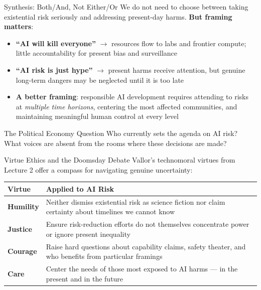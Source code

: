 \documentclass[aspectratio=169,11pt]{beamer}
\begin{document}
\begin{frame}{Synthesis: Both/And, Not Either/Or}
We do not need to choose between taking existential risk seriously and addressing present-day harms. \textbf{But framing matters}:

\vspace{0.2cm}
\begin{itemize}
    \item \textbf{``AI will kill everyone''} $\rightarrow$ resources flow to labs and frontier compute; little accountability for present bias and surveillance
    \item \textbf{``AI risk is just hype''} $\rightarrow$ present harms receive attention, but genuine long-term dangers may be neglected until it is too late
    \item \textbf{A better framing}: responsible AI development requires attending to risks at \emph{multiple time horizons}, centering the most affected communities, and maintaining meaningful human control at every level
\end{itemize}

\vspace{0.2cm}
\begin{alertblock}{The Political Economy Question}
Who currently sets the agenda on AI risk? What voices are absent from the rooms where these decisions are made?
\end{alertblock}
\end{frame}

\begin{frame}{Virtue Ethics and the Doomsday Debate}
Vallor's technomoral virtues from Lecture 2 offer a compass for navigating genuine uncertainty:

\vspace{0.2cm}
\begin{tabular}{@{}p{2.4cm}p{9.2cm}@{}}
\toprule
\textbf{Virtue} & \textbf{Applied to AI Risk} \\
\midrule
\textbf{Humility} & Neither dismiss existential risk as science fiction nor claim certainty about timelines we cannot know \\
\addlinespace
\textbf{Justice} & Ensure risk-reduction efforts do not themselves concentrate power or ignore present inequality \\
\addlinespace
\textbf{Courage} & Raise hard questions about capability claims, safety theater, and who benefits from particular framings \\
\addlinespace
\textbf{Care} & Center the needs of those most exposed to AI harms --- in the present and in the future \\
\bottomrule
\end{tabular}
\end{frame}
\end{document}
